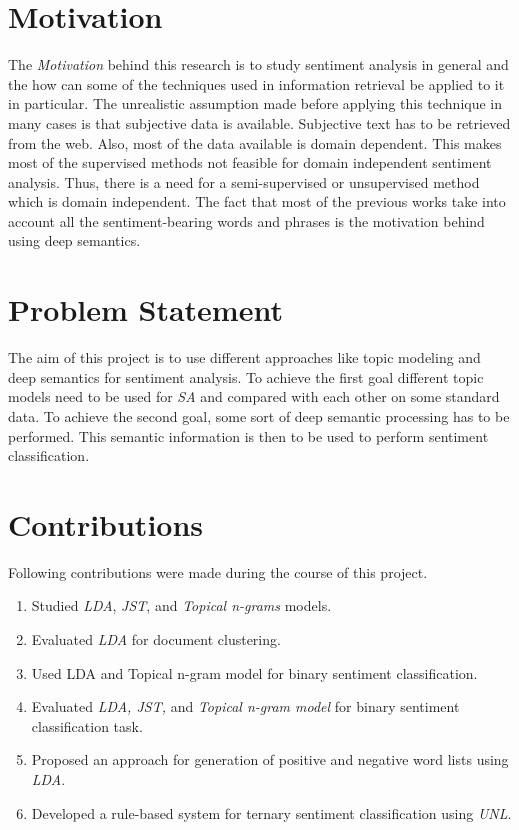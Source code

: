 \section{Motivation}
\par
The \textit{Motivation} behind this research is to study sentiment analysis in general and the how can some of the techniques used in information 
retrieval be applied to it in particular. The unrealistic assumption made before applying this technique in many cases is that subjective data is available. 
Subjective text has to be retrieved from the web. Also, most of the data available is domain dependent. This makes most of the supervised methods not 
feasible for domain independent sentiment analysis. Thus, there is a need for a semi-supervised or unsupervised method which is domain independent. The 
fact that most of the previous works take into account all the sentiment-bearing words and phrases is the motivation behind using deep semantics.


\section{Problem Statement}
\par
The aim of this project is to use different approaches like topic modeling and deep semantics for sentiment analysis. To achieve the first goal different topic
models need to be used for \textit{SA} and compared with each other on some standard data. To achieve the second goal, some sort of deep semantic processing 
has to be performed. This semantic information is then to be used to perform sentiment classification.

\section{Contributions}
\par
Following contributions were made during the course of this project.
\begin{enumerate}
 \item Studied \textit{LDA}, \textit{JST}, and \textit{Topical n-grams} models.
 \item Evaluated \textit{LDA} for document clustering.
 \item Used LDA and Topical n-gram model for binary sentiment classification.
 \item Evaluated \textit{LDA, JST,} and \textit{Topical n-gram model} for binary sentiment classification task.
 \item Proposed an approach for generation of positive and negative word lists using \textit{LDA}.
 \item Developed a rule-based system for ternary sentiment classification using \textit{UNL}.
\end{enumerate}


